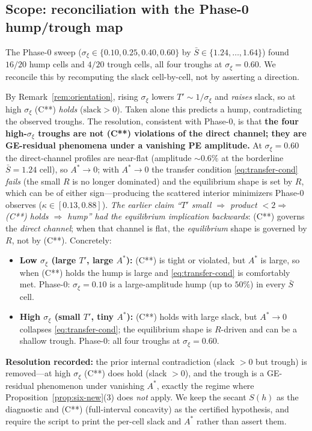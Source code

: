 \subsection*{Scope: reconciliation with the Phase-0 hump/trough map}
\label{sec:scope}

The Phase-0 sweep ($\sigma_\xi\in\{0.10,0.25,0.40,0.60\}$ by
$\bar S\in\{1.24,\dots,1.64\}$) found $16/20$ hump cells and $4/20$ trough
cells, all four troughs at $\sigma_\xi=0.60$. We reconcile this by recomputing
the slack cell-by-cell, not by asserting a direction.

By Remark~\ref{rem:orientation}, rising $\sigma_\xi$ lowers $T'\sim1/\sigma_\xi$
and \emph{raises} slack, so at high $\sigma_\xi$ (C**) \emph{holds}
($\mathrm{slack}>0$). Taken alone this predicts a hump, contradicting the
observed troughs. The resolution, consistent with Phase-0, is that \textbf{the
four high-$\sigma_\xi$ troughs are not (C**) violations of the direct channel;
they are GE-residual phenomena under a vanishing PE amplitude.} At
$\sigma_\xi=0.60$ the direct-channel profiles are near-flat (amplitude
$\sim0.6\%$ at the borderline $\bar S=1.24$ cell), so $A^\ast\to0$; with
$A^\ast\to0$ the transfer condition \eqref{eq:transfer-cond} \emph{fails} (the
small $R$ is no longer dominated) and the equilibrium shape is set by $R$,
which can be of either sign---producing the scattered interior minimizers
Phase-0 observes ($\kappa\in[0.13,0.88]$). \emph{The earlier claim ``$T'$ small
$\Rightarrow$ product $<2\Rightarrow$ (C**) holds $\Rightarrow$ hump'' had the
equilibrium implication backwards}: (C**) governs the \emph{direct channel};
when that channel is flat, the \emph{equilibrium} shape is governed by $R$, not
by (C**). Concretely:
\begin{itemize}
\item \textbf{Low $\sigma_\xi$ (large $T'$, large $A^\ast$):} (C**) is tight or
violated, but $A^\ast$ is large, so when (C**) holds the hump is large and
\eqref{eq:transfer-cond} is comfortably met. Phase-0: $\sigma_\xi=0.10$ is a
large-amplitude hump (up to $50\%$) in every $\bar S$ cell.
\item \textbf{High $\sigma_\xi$ (small $T'$, tiny $A^\ast$):} (C**) holds with
large slack, but $A^\ast\to0$ collapses \eqref{eq:transfer-cond}; the
equilibrium shape is $R$-driven and can be a shallow trough. Phase-0: all four
troughs at $\sigma_\xi=0.60$.
\end{itemize}
\textbf{Resolution recorded:} the prior internal contradiction (slack $>0$ but
trough) is removed---at high $\sigma_\xi$ (C**) does hold (slack $>0$), and the
trough is a GE-residual phenomenon under vanishing $A^\ast$, exactly the regime
where Proposition~\ref{prop:six-new}(3) does \emph{not} apply. We keep the
secant $S(h)$ as the diagnostic and (C**) (full-interval concavity) as the
certified hypothesis, and require the script to print the per-cell slack and
$A^\ast$ rather than assert them.

